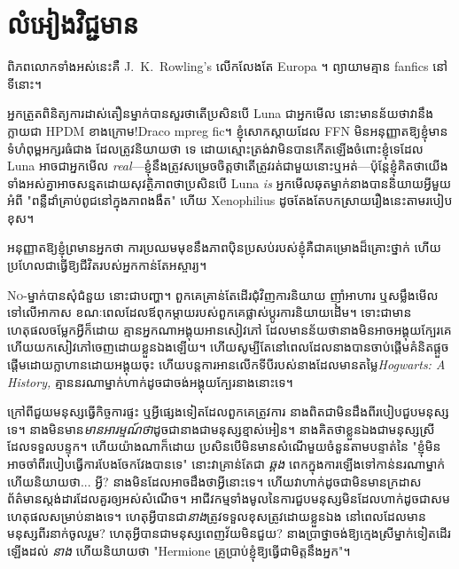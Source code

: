 \chapter{លំអៀងវិជ្ជមាន}

\begin{chapterOpeningAuthorNote}
ពិភពលោកទាំងអស់នេះគឺ J.~K.~Rowling's លើកលែងតែ Europa ។ ព្យាយាមគ្មាន fanfics នៅទីនោះ។

អ្នកត្រួតពិនិត្យការដាស់តឿនម្នាក់បានសួរថាតើប្រសិនបើ Luna ជាអ្នកមើល នោះមានន័យថាវានឹងក្លាយជា HPDM ខាងក្រោម!Draco mpreg fic។ ខ្ញុំសោកស្ដាយដែល FFN មិនអនុញ្ញាតឱ្យខ្ញុំមានទំហំពុម្ពអក្សរធំជាង ដែលត្រូវនិយាយថា ទេ ដោយស្មោះត្រង់វាមិនបានកើតឡើងចំពោះខ្ញុំទេដែល Luna អាចជាអ្នកមើល \emph{real}—ខ្ញុំនឹងត្រូវសម្រេចចិត្តថាតើត្រូវរត់ជាមួយនោះឬអត់—ប៉ុន្តែខ្ញុំគិតថាយើងទាំងអស់គ្នាអាចសន្មតដោយសុវត្ថិភាពថាប្រសិនបើ Luna \emph{is} អ្នកមើលឆុតម្នាក់នាងបាននិយាយអ្វីមួយអំពី "ពន្លឺដាំគ្រាប់ពូជនៅក្នុងភាពងងឹត" ហើយ Xenophilius ដូចតែងតែបកស្រាយរឿងនេះតាមរបៀបខុស។

\end{chapterOpeningAuthorNote}
\begin{chapterOpeningQuote}
អនុញ្ញាតឱ្យខ្ញុំព្រមានអ្នកថា ការប្រឈមមុខនឹងភាពប៉ិនប្រសប់របស់ខ្ញុំគឺជាគម្រោងដ៏គ្រោះថ្នាក់ ហើយប្រហែលជាធ្វើឱ្យជីវិតរបស់អ្នកកាន់តែអស្ចារ្យ។
\end{chapterOpeningQuote}

\lettrine{N}{o}-ម្នាក់បានសុំជំនួយ នោះជាបញ្ហា។ ពួកគេគ្រាន់តែដើរជុំវិញការនិយាយ ញ៉ាំអាហារ ឬសម្លឹងមើលទៅលើអាកាស ខណៈពេលដែលឪពុកម្តាយរបស់ពួកគេផ្លាស់ប្តូរការនិយាយដើម។ ទោះ​ជា​មាន​ហេតុផល​ចម្លែក​អ្វី​ក៏ដោយ គ្មាន​អ្នក​ណា​អង្គុយ​អាន​សៀវភៅ ដែល​មាន​ន័យ​ថា​នាង​មិន​អាច​អង្គុយ​ក្បែរ​គេ ហើយ​យក​សៀវភៅ​ចេញ​ដោយ​ខ្លួន​ឯង​ឡើយ។ ហើយសូម្បីតែនៅពេលដែលនាងបានចាប់ផ្តើមគំនិតផ្តួចផ្តើមដោយក្លាហានដោយអង្គុយចុះ ហើយបន្តការអានលើកទីបីរបស់នាងដែលមានតម្លៃ\emph{Hogwarts: A History,} គ្មាននរណាម្នាក់ហាក់ដូចជាចង់អង្គុយក្បែរនាងនោះទេ។

ក្រៅពីជួយមនុស្សធ្វើកិច្ចការផ្ទះ ឬអ្វីផ្សេងទៀតដែលពួកគេត្រូវការ នាងពិតជាមិនដឹងពីរបៀបជួបមនុស្សទេ។ នាងមិនមាន\emph{មានអារម្មណ៍ថា}ដូចជានាងជាមនុស្សខ្មាស់អៀន។ នាង​គិត​ថា​ខ្លួន​ឯង​ជា​មនុស្ស​ស្រី​ដែល​ទទួល​បន្ទុក។ ហើយយ៉ាងណាក៏ដោយ ប្រសិនបើមិនមានសំណើមួយចំនួនតាមបន្ទាត់នៃ "ខ្ញុំមិនអាចចាំពីរបៀបធ្វើការបែងចែកវែងបានទេ" នោះវាគ្រាន់តែជា \emph{ ឆ្គង} ពេកក្នុងការឡើងទៅកាន់នរណាម្នាក់ ហើយនិយាយថា... អ្វី? នាង​មិន​ដែល​អាច​ដឹង​ថា​អ្វី​នោះ​ទេ។ ហើយ​វា​ហាក់​ដូចជា​មិន​មាន​ក្រដាស​ព័ត៌មាន​ស្ដង់ដារ​ដែល​គួរ​ឲ្យ​អស់​សំណើច។ អាជីវកម្មទាំងមូលនៃការជួបមនុស្សមិនដែលហាក់ដូចជាសមហេតុផលសម្រាប់នាងទេ។ ហេតុអ្វីបានជា\emph{នាង}ត្រូវទទួលខុសត្រូវដោយខ្លួនឯង នៅពេលដែលមានមនុស្សពីរនាក់ចូលរួម? ហេតុអ្វីបានជាមនុស្សពេញវ័យមិនជួយ? នាង​ប្រាថ្នា​ចង់​ឱ្យ​ក្មេង​ស្រី​ម្នាក់​ទៀត​ដើរ​ឡើង​ដល់ \emph{នាង} ហើយ​និយាយ​ថា "Hermione គ្រូ​ប្រាប់​ខ្ញុំ​ឱ្យ​ធ្វើ​ជា​មិត្ត​នឹង​អ្នក"។

